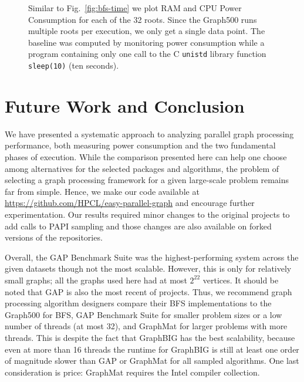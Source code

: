 \documentclass[conference]{IEEEtran}
\begin{document}
\begin{figure}
\begin{minipage}{0.48\linewidth}
	\end{minipage}
	\caption{Similar to Fig.~\ref{fig:bfs-time} we plot RAM and CPU Power Consumption for each of the 32 roots. Since the Graph500 runs multiple roots per execution, we only get a single data point. The baseline was computed by monitoring power consumption while a program containing only one call to the C \texttt{unistd} library function \texttt{sleep(10)} (ten seconds).}
	\label{fig:power}
\end{figure}

\section{Future Work and Conclusion}
We have presented a systematic approach to analyzing parallel graph processing performance, both measuring power consumption and the two fundamental phases of execution. While the comparison presented here can help one choose among alternatives for the selected packages and algorithms, the problem of selecting a graph processing framework for a given large-scale problem remains far from simple. Hence, we make our code available at \url{https://github.com/HPCL/easy-parallel-graph} and encourage further experimentation. Our results required minor changes to the original projects to add calls to PAPI sampling and those changes are also available on forked versions of the repositories. 

Overall, the GAP Benchmark Suite was the highest-performing system across the given datasets though not the most scalable. However, this is only for relatively small graphs; all the graphs used here had at most $2^{22}$ vertices. It should be noted that GAP is also the most recent of projects. Thus, we recommend graph processing algorithm designers compare their BFS implementations to the Graph500 for BFS, GAP Benchmark Suite for smaller problem sizes or a low number of threads (at most 32), and GraphMat for larger problems with more threads. This is despite the fact that GraphBIG has the best scalability, because even at more than 16 threads the runtime for GraphBIG is still at least one order of magnitude slower than GAP or GraphMat for all sampled algorithms. One last consideration is price: GraphMat requires the Intel compiler collection.

\end{document}
